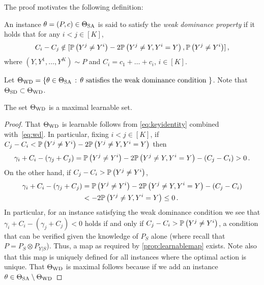 The proof motivates the following definition:
\begin{definition}
	An instance $\theta = (P,c)\in \Theta_{\mathrm{SA}}$  is said to satisfy the \emph{weak dominance property} if 
	it holds that for any $i<j\in [K]$,
\begin{align}\label{eq:wd}
	C_i-C_j \notin [ \mathbb{P}\left( Y^j \ne Y^i \right) -2 \mathbb{P}\left( Y^j\ne Y, Y^i = Y \right), \mathbb{P}\left( Y^j \ne Y^i \right) ]\,,
\end{align}
where $(Y,Y^1,\dots,Y^K)\sim P$ and $C_i = c_1+\dots+c_i$, $i\in [K]$.
\end{definition}
Let $\Theta_{\mathrm{WD}} = \{ \theta\in \Theta_{\mathrm{SA}}\,:\, \theta \text{ satisfies the weak dominance condition } \}$.
Note that $\Theta_{\mathrm{SD}}\subset \Theta_{\mathrm{WD}}$.
\begin{thm}
The set $\Theta_{\mathrm{WD}}$ is a maximal learnable set.
\end{thm}
\begin{proof}
That $\Theta_{\mathrm{WD}}$ is learnable follows from \eqref{eq:keyidentity} combined with~\eqref{eq:wd}.
In particular, fixing $i<j\in [K]$, if $C_j-C_i<\mathbb{P}\left( Y^j \ne Y^i \right) -2 \mathbb{P}\left( Y^j\ne Y, Y^i = Y \right)$ then
\begin{align*}
\gamma_i+C_i-(\gamma_j+C_j) 
 = \mathbb{P}\left( Y^j \ne Y^i \right) -2 \mathbb{P}\left( Y^j\ne Y, Y^i = Y \right) - (C_j-C_i)  >  0\,.
\end{align*}
On the other hand, if $C_j-C_i>\mathbb{P}\left(Y^j\ne Y^i\right)$,
\begin{align*}
\gamma_i+C_i-(\gamma_j+C_j) 
& = \mathbb{P}\left( Y^j \ne Y^i \right) -2 \mathbb{P}\left( Y^j\ne Y, Y^i = Y \right) - (C_j-C_i) \\
 & <  -2 \mathbb{P}\left( Y^j\ne Y, Y^i = Y \right) \le 0 \,.
\end{align*}
In particular, for an instance satisfying the weak dominance condition we see that
$\gamma_i+C_i-(\gamma_j+C_j) <0$ holds if and only if $C_j-C_i>\mathbb{P}\left(Y^j\ne Y^i\right)$, a condition
that can be verified given the knowledge of $P_S$ alone (where recall that $P = P_S \otimes P_{Y|S}$).
Thus, a map as required by \cref{prop:learnablemap} exists. Note also that this map is uniquely defined for all instances
where the optimal action is unique.
That $\Theta_{\mathrm{WD}}$ is maximal follows because if we add an instance $\theta\in \Theta_{\mathrm{SA}} \setminus \Theta_{\mathrm{WD}}$ 
\end{proof}

